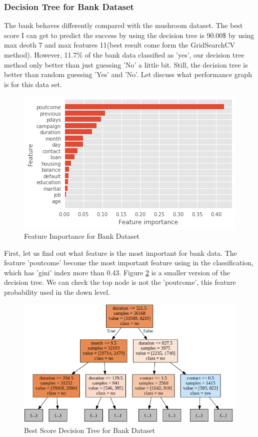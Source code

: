 \documentclass[10pt, conference, compsocconf]{IEEEtran}
\begin{document}
\subsubsection{Decision Tree for Bank Dataset}
The bank behaves differently compared with the mushroom dataset. The best score I can get to predict the success by using the decision tree is 90.00\$ by using max deoth 7 and max features 11(best result come form the GridSearchCV method). However, 11.7\% of the bank data classified as 'yes', our decision tree method only better than just guessing 'No' a little bit. Still, the decision tree is better than random guessing 'Yes' and 'No'. Let discuss what performance graph is for this data set. \\
\begin{figure}[h]
	\centering
	\includegraphics[scale = 0.5]{image/bank_important.png}
	\caption{Feature Importance for Bank Dataset }
	\label{fig:bank_dt_important}
\end{figure}
First, let us find out what feature is the most important for bank data. The feature 'poutcome' become the most important feature using in the classification, which has 'gini' index more than 0.43. Figure \ref{fig:bank_dt_tree} is a smaller version of the decision tree. We can check the top node is not the 'poutcome', this feature probability used in the down level. 
\begin{figure}[h]
	\centering
	\includegraphics[scale = 0.3]{image/bank_dt_tree.png}
	\caption{Best Score Decision Tree for Bank Dataset }
	\label{fig:bank_dt_tree}
\end{figure}
\end{document}
